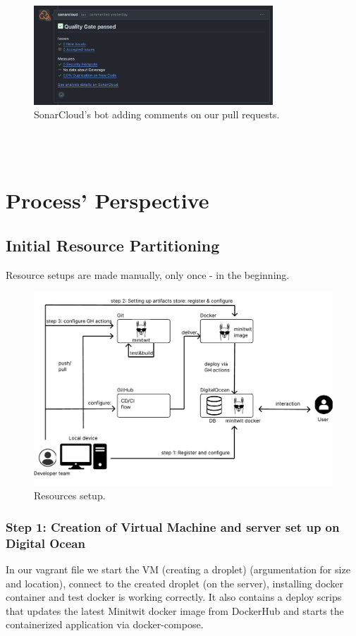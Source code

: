 \documentclass{article}
\begin{document}
\begin{figure}[ht]
    \centering
    \includegraphics[width=0.8\textwidth]{./images/SonarCloud_bot.png}
    \caption{SonarCloud's bot adding comments on our pull requests.}
    \label{fig:notion-dashboard}
\end{figure}
\\\\

\section{Process' Perspective}

\subsection{Initial Resource Partitioning}
Resource setups  are made manually, only once - in the beginning.
\clearpage
\begin{figure}[ht]
    \centering
    \includegraphics[width=1.0\textwidth]{./pdfs/resourse_setup.pdf} 
    \caption{Resources setup.}
    \label{fig:Resourse setup}
\end{figure}

\subsubsection{Step 1: Creation of Virtual Machine and server set up on Digital Ocean}
In our vagrant file we start the VM (creating a droplet) (argumentation for size and location), connect to the created droplet (on the server), installing docker container and test docker is working correctly. It also contains a deploy scrips that updates the latest Minitwit docker image from DockerHub and starts the containerized application via docker-compose.
\end{document}
